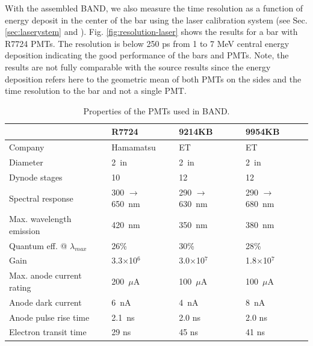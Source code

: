 \documentclass[3p,final,twocolumn]{elsarticle}
\begin{document}
With the assembled BAND, we also measure the time resolution as a function of energy deposit in the center of the bar using the laser calibration system (see Sec. \ref{sec:laserystem} and \cite{band-laser}). Fig. \ref{fig:resolution-laser} shows the results for a bar with R7724 PMTs. The resolution is below 250 \si{\pico\s} from 1 to 7 \si{\mega\electronvolt} central energy deposition indicating the good performance of the bars and PMTs. Note, the results are not fully comparable with the source results since the energy deposition refers here to the geometric mean of both PMTs on the sides and the time resolution to the bar and not a single PMT.


\begin{table}[tbh]
\caption{Properties of the PMTs used in BAND. }
\centering
\begin{tabular} { l  l  l l } \hline
 &  R7724 \cite{pmtR7724} & 9214KB \cite{pmt9214}& 9954KB \cite{pmt9954} \\ \hline\hline
Company                                  & Hamamatsu       & ET           & ET \\
Diameter                                           & 2~in                         & 2~in                        & 2~in \\ 
Dynode stages                                  & 10                           & 12                              & 12 \\
Spectral response                            & 300 $\to$ 650~nm & 290 $\to$ 630~nm & 290 $\to$ 680~nm \\ 
Max. wavelength emission               & 420~nm & 350~nm & 380~nm \\ 
Quantum eff. @ $\lambda_{max}$   & 26\% & 30\% & 28\% \\ 
Gain                                                    & 3.3$\times$10$^6$ & 3.0$\times$10$^7$ & 1.8$\times$10$^7$ \\ 
Max. anode current rating               & 200~$\mu$A & 100~$\mu$A & 100~$\mu$A \\ 
Anode dark current                         & 6~nA  & 4~nA & 8~nA \\ 
Anode pulse rise time                      & 2.1~ns & 2.0 ns & 2.0 ns \\ 
Electron transit time                        & 29 ns & 45 ns & 41 ns \\
\hline
\end{tabular}
\label{tab:pmts}
\end{table}
\end{document}
